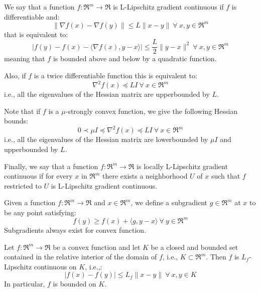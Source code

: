 \begin{definition} \label{def:l_lipschitz_continuity}
We say that a function $f: \Re^m \rightarrow \Re$ is L-Lipschitz gradient continuous if $f$ is differentiable and:
$$
\| \nabla f(x) - \nabla f(y) \| \leq L \| x - y \| \ \forall \ x, y \in \Re^m
$$
that is equivalent to:
$$
| f(y) - f(x) - \langle \nabla f(x), y - x \rangle | \leq \frac{L}{2} \| y - x \|^2 \ \forall \ x, y \in \Re^m
$$
meaning that $f$ is bounded above and below by a quadratic function.

Also, if $f$ is a twice differentiable function this is equivalent to:
$$
\nabla^2 f(x) \preceq L I \ \forall \ x \in \Re^m
$$
i.e., all the eigenvalues of the Hessian matrix are upperbounded by $L$.

Note that if $f$ is a $\mu$-strongly convex function, we give the following Hessian bounds:
$$
0 \prec \mu I \preceq \nabla^2 f(x) \preceq L I \ \forall \ x \in \Re^m
$$
i.e., all the eigenvalues of the Hessian matrix are lowerbounded by $\mu I$ and upperbounded by $L$.

Finally, we say that a function $f: \Re^m \rightarrow \Re$ is locally L-Lipschitz gradient continuous if for every $x$ in $\Re^m$ there exists a neighborhood $U$ of $x$ such that $f$ restricted to $U$ is L-Lipschitz gradient continuous.
\end{definition}

\begin{definition}[Subgradient] \label{def:subgradient}
Given a function $f: \Re^m \rightarrow \Re$ and $x \in \Re^m$, we define a subgradient $g \in \Re^m$ at $x$ to be any point satisfying:
$$
	f(y) \geq f(x) + \langle g, y - x \rangle \ \forall \ y \in \Re^m
$$
Subgradients always exist for convex function.
\end{definition}


\begin{theorem}[\href{http://web.mit.edu/dimitrib/www/Convex_Theory_Entire_Book.pdf\#page=196}{$L_f$-Lipschitz continuity for convex functions}] \label{def:l_f_lipschitz_convex}
Let $f: \Re^m \rightarrow \Re$ be a convex function and let $K$ be a closed and bounded set contained in the relative interior of the domain of $f$, i.e., $K \subset \Re^m$. Then $f$ is $L_f$-Lipschitz continuous on $K$, i.e.,:
$$
| f(x) - f(y) | \leq L_f \| x - y \| \ \forall \ x, y \in K
$$
In particular, $f$ is bounded on $K$.
\end{theorem}

